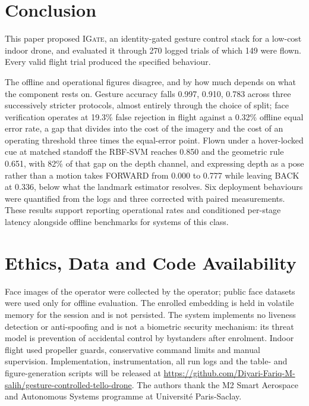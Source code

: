 \documentclass[conference]{IEEEtran}
\newcommand{\method}[1]{\textsc{#1}}
\begin{document}
\section{Conclusion}

This paper proposed \method{IGate}, an identity-gated gesture control stack for
a low-cost indoor drone, and evaluated it through 270 logged trials of which 149
were flown. Every valid flight trial produced the specified behaviour.

The offline and operational figures disagree, and by how much depends on what
the component rests on. Gesture accuracy falls 0.997, 0.910, 0.783 across three
successively stricter protocols, almost entirely through the choice of split;
face verification operates at 19.3\% false rejection in flight against a 0.32\%
offline equal error rate, a gap that divides into the cost of the imagery and
the cost of an operating threshold three times the equal-error point. Flown
under a hover-locked cue at matched standoff the RBF-SVM reaches 0.850 and the
geometric rule 0.651, with 82\% of that gap on the depth channel, and expressing
depth as a pose rather than a motion takes FORWARD from 0.000 to 0.777 while
leaving BACK at 0.336, below what the landmark estimator resolves. Six
deployment behaviours were quantified from the logs and three corrected with
paired measurements. These results support reporting operational rates and
conditioned per-stage latency alongside offline benchmarks for systems of this
class.

\section*{Ethics, Data and Code Availability}

Face images of the operator were collected by the operator; public face datasets
were used only for offline evaluation. The enrolled embedding is held in volatile
memory for the session and is not persisted. The system implements no liveness
detection or anti-spoofing and is not a biometric security mechanism: its threat
model is prevention of accidental control by bystanders after enrolment. Indoor
flight used propeller guards, conservative command limits and manual supervision.
Implementation, instrumentation, all run logs and the table- and
figure-generation scripts will be released at
\url{https://github.com/Diyari-Fariq-M-salih/gesture-controlled-tello-drone}. The
authors thank the M2 Smart Aerospace and Autonomous Systems programme at
Universit\'e Paris-Saclay.

\balance


\end{document}
